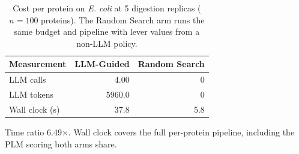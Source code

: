 \begin{table}[!tb]
  \centering
  \caption{Cost per protein on \textnormal{\textnormal{\textit{E. coli}}} at 5 digestion replicas ($n=100$ proteins). The Random Search arm runs the same budget and pipeline with lever values from a non-LLM policy.}
  \label{tab:cost_ecoli_r5}
  \begin{tabular}{lrr}
    \toprule
    Measurement & LLM-Guided & Random Search \\
    \midrule
    LLM calls & 4.00 & 0 \\
    LLM tokens & 5960.0 & 0 \\
    Wall clock (s) & 37.8 & 5.8 \\
    \bottomrule
  \end{tabular}
  \par\smallskip\footnotesize{Time ratio 6.49$\times$. Wall clock covers the full per-protein pipeline, including the PLM scoring both arms share.}
\end{table}

